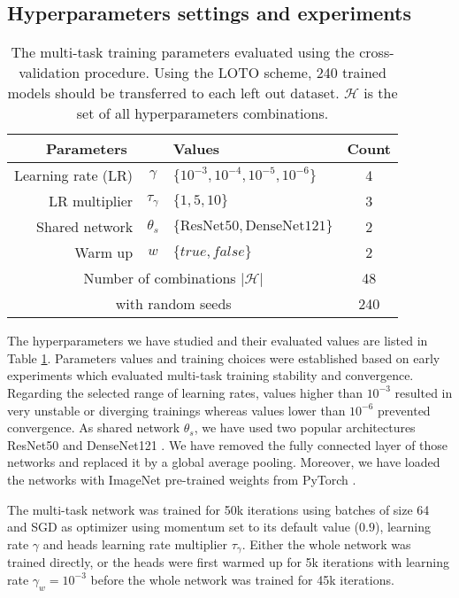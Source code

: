 \subsection{Hyperparameters settings and experiments}
\label{ssec:mtask:exp:parameters} 

\begin{table}
    \centering
    \begin{tabular}{|rc|l|c|}
        \hline
        \multicolumn{2}{|c|}{Parameters} & Values & Count \\
        \hline
        Learning rate (LR) & $\gamma$ & $\{10^{-3}, 10^{-4}, 10^{-5}, 10^{-6}\}$ & 4 \\
        LR multiplier & $\tau_\gamma$ & $\{1, 5, 10\}$ & 3 \\
        Shared network & $\theta_s$ & $\{\text{ResNet50}, \text{DenseNet121}\}$ & 2 \\
        Warm up & $w$ & $\{true, false\}$ & 2 \\
        \hline
        \multicolumn{3}{|c|}{Number of combinations $\left|\mathcal{H}\right|$} & 48 \\
        \hline
        \multicolumn{3}{|c|}{with random seeds} & 240 \\
        \hline
    \end{tabular}
    \caption{The multi-task training parameters evaluated using the cross-validation procedure. Using the LOTO scheme, 240 trained models should be transferred to each left out dataset. $\mathcal{H}$ is the set of all hyperparameters combinations.}
    \label{tab:mtask:results:parameters}
\end{table}

The hyperparameters we have studied and their evaluated values are listed in Table \ref{tab:mtask:results:parameters}. Parameters values and training choices were established based on early experiments which evaluated multi-task training stability and convergence. Regarding the selected range of learning rates, values higher than $10^{-3}$ resulted in very unstable or diverging trainings whereas values lower than $10^{-6}$ prevented convergence. As shared network $\theta_s$, we have used two popular architectures ResNet50 \parencite{he2016deep} and DenseNet121 \parencite{huang2017densely}. We have removed the fully connected layer of those networks and replaced it by a global average pooling. Moreover, we have loaded the networks with ImageNet pre-trained weights from PyTorch \parencite{paszke2019pytorch}.

The multi-task network was trained for 50k iterations using batches of size 64 and SGD as optimizer using momentum set to its default value (\ie $0.9$), learning rate $\gamma$ and heads learning rate multiplier $\tau_\gamma$. Either the whole network was trained directly, or the heads were first warmed up for 5k iterations with learning rate $\gamma_w = 10^{-3}$ before the whole network was trained for 45k iterations.

